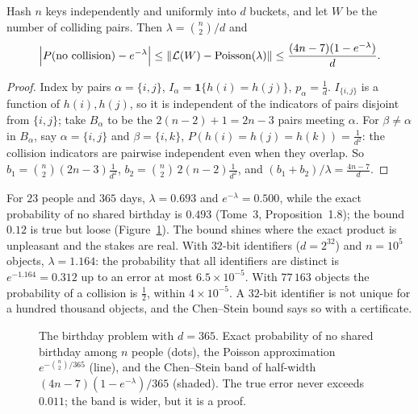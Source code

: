 \begin{example}\label{ex:hashcs}
Hash $n$ keys independently and uniformly into $d$ buckets, and let $W$ be the number of colliding pairs. Then $\lambda=\binom n2/d$ and
\[
\Bigl|P(\text{no collision})-e^{-\lambda}\Bigr|\le\|\mathcal L(W)-\text{Poisson}(\lambda)\|\le\frac{(4n-7)(1-e^{-\lambda})}d.
\]
\end{example}
\begin{proof}
Index by pairs $\alpha=\{i,j\}$, $I_\alpha=\mathbf 1\{h(i)=h(j)\}$, $p_\alpha=\frac1d$. $I_{\{i,j\}}$ is a function of $h(i),h(j)$, so it is independent of the
indicators of pairs disjoint from $\{i,j\}$; take $B_\alpha$ to be the $2(n-2)+1=2n-3$ pairs meeting $\alpha$. For $\beta\ne\alpha$ in $B_\alpha$, say $\alpha=\{i,j\}$
and $\beta=\{i,k\}$, $P(h(i)=h(j)=h(k))=\frac1{d^2}$: the collision indicators are pairwise independent even when they overlap. So
$b_1=\binom n2(2n-3)\frac1{d^2}$, $b_2=\binom n2\,2(n-2)\frac1{d^2}$, and $(b_1+b_2)/\lambda=\frac{4n-7}d$.
\end{proof}

For $23$ people and $365$ days, $\lambda=0.693$ and $e^{-\lambda}=0.500$, while the exact probability of no shared birthday is $0.493$ (Tome~3, Proposition~1.8);
the bound $0.12$ is true but loose (Figure~\ref{fig:birthday}). The bound shines where the exact product is unpleasant and the stakes are real. With $32$-bit identifiers
($d=2^{32}$) and $n=10^5$ objects, $\lambda=1.164$: the probability that all identifiers are distinct is $e^{-1.164}=0.312$ up to an error at most
$6.5\times10^{-5}$. With $77\,163$ objects the probability of a collision is $\frac12$, within $4\times10^{-5}$. A $32$-bit identifier is not unique for a hundred
thousand objects, and the Chen--Stein bound says so with a certificate.

\begin{figure}[ht]
\centering{}
\caption{The birthday problem with $d=365$. Exact probability of no shared birthday among $n$ people (dots), the Poisson approximation $e^{-\binom n2/365}$ (line),
and the Chen--Stein band of half-width $(4n-7)(1-e^{-\lambda})/365$ (shaded). The true error never exceeds $0.011$; the band is wider, but it is a proof.}
\label{fig:birthday}
\end{figure}

